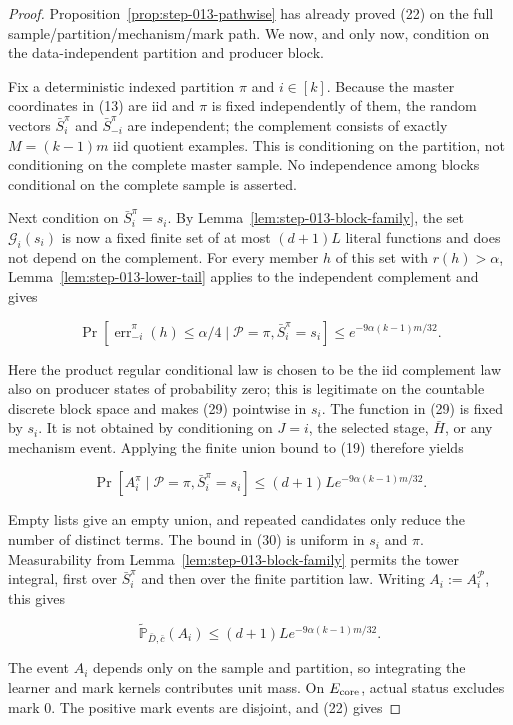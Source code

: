 \begin{proof}
Proposition~\ref{prop:step-013-pathwise} has already proved
(22) on the full sample/partition/mechanism/mark path. We now, and only
now, condition on the data-independent partition and producer block.

Fix a deterministic indexed partition \(\pi\) and \(i\in[k]\). Because
the master coordinates in (13) are iid and \(\pi\) is fixed independently
of them, the random vectors \(\bar S_i^\pi\) and
\(\bar S_{-i}^\pi\) are independent; the complement consists of exactly
\(M=(k-1)m\) iid quotient examples. This is conditioning on the partition,
not conditioning on the complete master sample. No independence among
blocks conditional on the complete sample is asserted.

Next condition on \(\bar S_i^\pi=s_i\). By
Lemma~\ref{lem:step-013-block-family}, the set
\(\mathcal G_i(s_i)\) is now a fixed finite set of at most \((d+1)L\)
literal functions and does not depend on the complement. For every member
\(h\) of this set with \(r(h)>\alpha\),
Lemma~\ref{lem:step-013-lower-tail} applies to the independent complement
and gives

\[
 \Pr\left[
   \widehat{\operatorname{err}}_{-i}^\pi(h)\leq\alpha/4
   \mid\mathcal P=\pi,\bar S_i^\pi=s_i
 \right]
 \leq e^{-9\alpha(k-1)m/32}.
 \tag{29}
\]

Here the product regular conditional law is chosen to be the iid complement
law also on producer states of probability zero; this is legitimate on the
countable discrete block space and makes (29) pointwise in \(s_i\).
The function in (29) is fixed by \(s_i\). It is not obtained by
conditioning on \(J=i\), the selected stage, \(\bar H\), or any mechanism
event. Applying the finite union bound to (19) therefore yields

\[
 \Pr[A_i^\pi\mid\mathcal P=\pi,\bar S_i^\pi=s_i]
 \leq(d+1)L e^{-9\alpha(k-1)m/32}.
 \tag{30}
\]

Empty lists give an empty union, and repeated candidates only reduce the
number of distinct terms. The bound in (30) is uniform in \(s_i\) and
\(\pi\). Measurability from
Lemma~\ref{lem:step-013-block-family} permits the tower integral, first
over \(\bar S_i^\pi\) and then over the finite partition law. Writing
\(A_i:=A_i^{\mathcal P}\), this gives

\[
 \widetilde{\mathbb P}_{\bar D,\bar c}(A_i)
 \leq(d+1)L e^{-9\alpha(k-1)m/32}.
 \tag{31}
\]

The event \(A_i\) depends only on the sample and partition, so integrating
the learner and mark kernels contributes unit mass. On \(E_{\rm core}\),
 actual status excludes mark \(0\). The positive mark events are
disjoint, and (22) gives


\end{proof}

